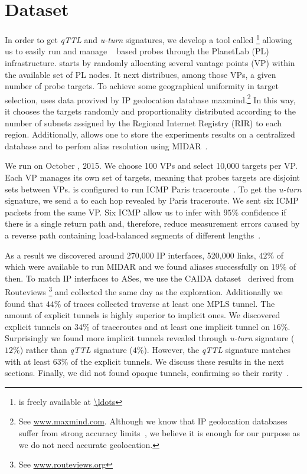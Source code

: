 \section{Dataset}\label{dataset}
In order to get \textit{qTTL} and \textit{u-turn} signatures, we develop a tool
called \magallanes\footnote{\magallanes is freely available at \url{\ldots}}
allowing us to easily run and manage \scamper~\cite{Luckie10} based probes
through the PlanetLab (PL) infrastructure.  \magallanes starts by randomly
allocating several vantage points (VP) within the available set of PL nodes.  It
next distribues, among those VPs, a given number of probe targets.
To achieve some geographical uniformity in target selection, \magallanes uses
data provived by IP geolocation database maxmind.\footnote{See
\url{www.maxmind.com}.  Although we know that IP geolocation databases suffer
from strong accuracy limits~\cite{geolocation}, we believe it is enough for our
purpose as we do not need accurate geolocation.}  In this way, it chooses the
targets randomly and proportionality distributed according to the number of
subnets assigned by the Regional Internet Registry (RIR) to each region.
Additionally, \magallanes allows one to store the experiments results on a
centralized database and to perfom alias resolution using MIDAR~\cite{Keys13}.

We run \magallanes on October , 2015.  We choose 100 VPs and select
10,000 targets per VP.  Each VP manages its own set of targets, meaning that
probes targets are disjoint sets between VPs.  \scamper is configured to run
ICMP Paris traceroute~\cite{BRICE06}.  To get the \textit{u-turn} signature,
we send a \ping to each hop revealed by Paris traceroute. We sent six
ICMP \echorequest packets from the same VP.  Six ICMP \echoreply allow us to
infer with $95\%$ confidence if there is a single return path and, 
therefore, reduce measurement errors caused by a reverse path containing
load-balanced segments of different lengths~\cite{BRICE07}. 

As a result we discovered around 270,000 IP interfaces,  520,000 links, $42\%$
of which were available to run MIDAR and we found aliases successfully on $19\%$
of then. To match IP interfaces to ASes, we use the CAIDA
dataset~\cite{caida_ref} derived from Routeviews \footnote{See
\url{www.routeviews.org}} and collected the same day as the exploration.
Additionally we found that $44\%$ of traces collected traverse at least one MPLS
tunnel.  The amount of explicit tunnels is highly superior to implicit ones. We
discovered explicit tunnels on $34\%$ of traceroutes and at least one implicit
tunnel on $16\%$. Surprisingly we found more implicit tunnels revealed through
\textit{u-turn} signature ($12\%$) rather than \textit{qTTL} signature ($4\%$).
However, the \textit{qTTL} signature matches with at least $63\%$ of the
explicit tunnels. We discuss these results in the next sections. Finally, we did
not found opaque tunnels, confirming so their rarity~\cite{VAN2013}.
